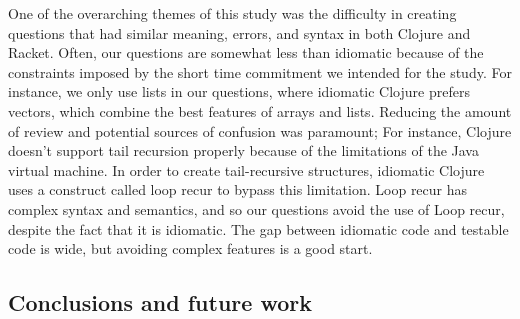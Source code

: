 \documentclass[submission,copyright,creativecommons]{eptcs}
\newcommand{\allcomments}[1]{{#1}}
\newcommand{\hfcomment}[1]{\textcolor{Teal}{\allcomments{Henry: {#1}}}}
\begin{document}
	One of the overarching themes of this study was the difficulty in creating questions that had similar meaning, errors, and syntax in both Clojure and Racket. 
	Often, our questions are somewhat less than idiomatic because of the constraints imposed by the short time commitment we intended for the study.
	For instance, we only use lists in our questions, where idiomatic Clojure prefers vectors, which combine the best features of arrays and lists.
	 Reducing the amount of review and potential sources of confusion was paramount; For instance, Clojure doesn't support tail recursion properly because of the limitations of the Java virtual machine.
	 In order to create tail-recursive structures, idiomatic Clojure uses a construct called loop recur to bypass this limitation.
	 Loop recur has complex syntax and semantics, and so our questions avoid the use of Loop recur, despite the fact that it is idiomatic. 
	 The gap between idiomatic code and testable code is wide, but avoiding complex features is a good start. %

\subsection{Conclusions and future work}\label{sec:future}



\end{document}
